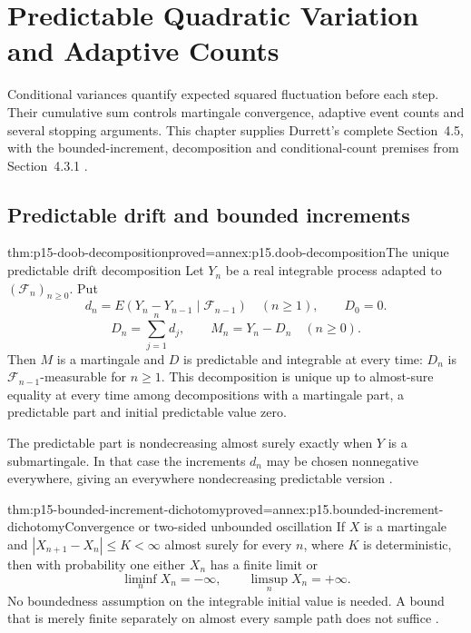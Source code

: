 \chapter{Predictable Quadratic Variation and Adaptive Counts}
\label{sec:p15-predictable-quadratic-variation}

Conditional variances quantify expected squared fluctuation before
each step. Their cumulative sum controls martingale convergence,
adaptive event counts and several stopping arguments. This chapter
supplies Durrett's complete Section~4.5, with the bounded-increment,
decomposition and conditional-count premises from Section~4.3.1
\cite[pp.~224--226, 240--244]{DurrettPTEAuthor2019}.

\section{Predictable drift and bounded increments}
\label{sec:p15-predictable-drift}

\begin{hbtheorem}{thm:p15-doob-decomposition}{proved=annex:p15.doob-decomposition}{The unique predictable drift decomposition}
Let \(Y_n\) be a real integrable process adapted to
\((\mathcal F_n)_{n\geq0}\). Put
\[
 d_n=E(Y_n-Y_{n-1}\mid\mathcal F_{n-1})\quad(n\geq1),\qquad D_0=0.
\]
\[
 D_n=\sum_{j=1}^nd_j,\qquad M_n=Y_n-D_n\quad(n\geq0).
\]
Then \(M\) is a martingale and \(D\) is predictable and integrable
at every time: \(D_n\) is \(\mathcal F_{n-1}\)-measurable for \(n\geq1\).
This decomposition is unique up to almost-sure equality at every time
among decompositions with a martingale part, a predictable part and
initial predictable value zero.

The predictable part is nondecreasing almost surely exactly when
\(Y\) is a submartingale. In that case the increments \(d_n\)
may be chosen nonnegative everywhere, giving an everywhere
nondecreasing predictable version
\cite[thm.~4.3.2]{DurrettPTEAuthor2019}.
\end{hbtheorem}

\begin{hbtheorem}{thm:p15-bounded-increment-dichotomy}{proved=annex:p15.bounded-increment-dichotomy}{Convergence or two-sided unbounded oscillation}
If \(X\) is a martingale and
\(|X_{n+1}-X_n|\leq K<\infty\) almost surely for every \(n\),
where \(K\) is deterministic, then with probability one either
\(X_n\) has a finite limit or
\[
                      \liminf_nX_n=-\infty,\qquad
                      \limsup_nX_n=+\infty.
\]
No boundedness assumption on the integrable initial value is needed.
A bound that is merely finite separately on almost every sample path
does not suffice \cite[thm.~4.3.1]{DurrettPTEAuthor2019}.
\end{hbtheorem}

